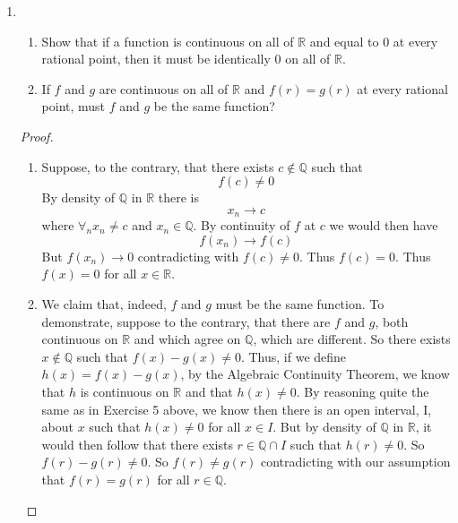 \begin{enumerate}
    \item \begin{enumerate}
        \item Show that if a function is continuous on all of \( \mathbb{R} \) and equal to \( 0 \) at every rational point, then it must be identically \( 0 \) on all of \( \mathbb{R} \).
        
        \item If \( f \) and \( g \) are continuous on all of \( \mathbb{R} \) and \( f(r) = g(r) \) at every rational point, must \( f \) and \( g \) be the same function?
    \end{enumerate}
    
    \begin{proof}
    \begin{enumerate}
        \item Suppose, to the contrary, that there exists \( c \not\in \mathbb{Q} \) such that
        \[
        f(c) \neq 0
        \]
        By density of \( \mathbb{Q} \) in \( \mathbb{R} \) there is
        \[
        x_{n} \rightarrow c
        \]
        where \( \forall_{n} x_{n} \neq c \) and \( x_{n} \in \mathbb{Q} \). By continuity of \( f \) at \( c \) we would then have
        \[
        f(x_{n}) \rightarrow f(c)
        \]
        But \( f(x_{n}) \rightarrow 0 \) contradicting with \( f(c) \neq 0 \). Thus \( f(c) = 0 \). Thus \(f(x) = 0 \) for all \( x \in \mathbb{R} \).
        
        \item We claim that, indeed, \( f \) and \( g \) must be the same function. To demonstrate, suppose to the contrary, that there are \( f \) and \( g \), both continuous on \( \mathbb{R} \) and which agree on \( \mathbb{Q} \), which are different. So there exists \( x \not\in \mathbb{Q} \) such that \( f(x) - g(x) \neq 0 \). Thus, if we define \( h(x) = f(x) - g(x) \), by the Algebraic Continuity Theorem, we know that \( h \) is continuous on \( \mathbb{R} \) and that \( h(x) \neq 0 \). By reasoning quite the same as in Exercise 5 above, we know then there is an open interval, I, about \( x \) such that \( h(x) \neq 0 \) for all \( x \in I \). But by density of \( \mathbb{Q} \) in \( \mathbb{R} \), it would then follow that there exists \( r \in \mathbb{Q} \cap I\) such that \( h(r) \neq 0 \). So \( f(r) - g(r) \neq 0 \). So \( f(r) \neq g(r) \) contradicting with our assumption that \( f(r) = g(r) \) for all \( r \in \mathbb{Q} \). 
    \end{enumerate}
    \end{proof}
    

\end{enumerate}
